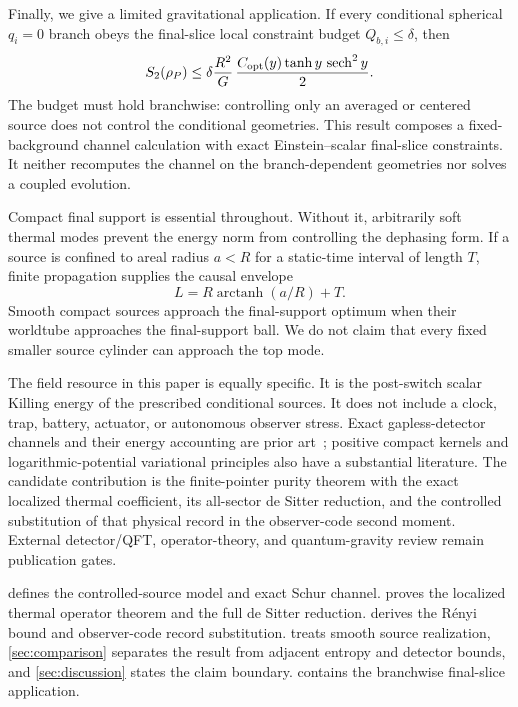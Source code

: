 Finally, we give a limited gravitational application.  If every conditional
spherical $q_i=0$ branch obeys the final-slice local constraint budget
$Q_{b,i}\leq\delta$, then
\begin{equation}
 S_2(\rho_P)\leq
 \delta\frac{R^2}{G}\,
 \frac{C_{\rm opt}(y)\tanh y\,\operatorname{sech}^2y}{2}.
 \label{eq:intro-gravity-bound}
\end{equation}
The budget must hold branchwise: controlling only an averaged or centered
source does not control the conditional geometries.  This result composes a
fixed-background channel calculation with exact Einstein--scalar
final-slice constraints.  It neither recomputes the channel on the
branch-dependent geometries nor solves a coupled evolution.

Compact final support is essential throughout.  Without it, arbitrarily soft
thermal modes prevent the energy norm from controlling the dephasing form.
If a source is confined to areal radius $a<R$ for a static-time interval of
length $T$, finite propagation supplies the causal envelope
\begin{equation}
 L=R\operatorname{arctanh}(a/R)+T.
 \label{eq:intro-source-envelope}
\end{equation}
Smooth compact sources approach the final-support optimum when their
worldtube approaches the final-support ball.  We do not claim that every
fixed smaller source cylinder can approach the top mode.

The field resource in this paper is equally specific.  It is the
post-switch scalar Killing energy of the prescribed conditional sources.  It
does not include a clock, trap, battery, actuator, or autonomous observer
stress.  Exact gapless-detector channels and their energy accounting are
prior art~\cite{Landulfo2016,BarcellosLandulfo2021,BatistaEtAl2026}; positive
compact kernels and logarithmic-potential variational principles also have a
substantial literature.  The candidate contribution is the finite-pointer
purity theorem with the exact localized thermal coefficient, its all-sector
de Sitter reduction, and the controlled substitution of that physical record
in the observer-code second moment.  External detector/QFT, operator-theory,
and quantum-gravity review remain publication gates.

 defines the controlled-source model and exact Schur channel.
 proves the localized thermal operator theorem and the full
de Sitter reduction.   derives the R\'enyi bound and
observer-code record substitution.   treats smooth source
realization, \cref{sec:comparison} separates the result from adjacent entropy
and detector bounds, and \cref{sec:discussion} states the claim boundary.
 contains the branchwise final-slice application.
